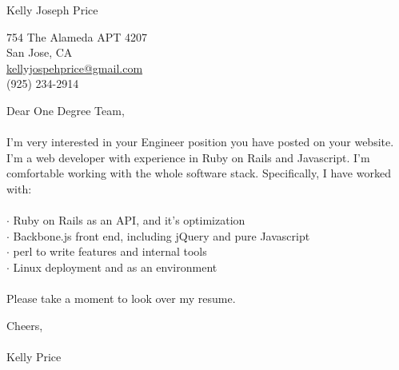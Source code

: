 \documentclass{article}
\begin{document}
\huge{Kelly Joseph Price}
\normalsize

\hspace{.5cm}

754 The Alameda APT 4207 \\
San Jose, CA \\
\href{mailto:kellyjosephprice@gmail.com}{kellyjospehprice@gmail.com} \\
(925) 234-2914 \\

\vspace{6cm}

Dear One Degree Team,
\\\\
I'm very interested in your Engineer position you have
posted on your website. I'm a web developer with experience in Ruby on
Rails and Javascript. I'm comfortable working with the whole software
stack. Specifically, I have worked with: \\
\\
$\cdot$ Ruby on Rails as an API, and it's optimization \\
$\cdot$ Backbone.js front end, including jQuery and pure Javascript \\
$\cdot$ perl to write features and internal tools \\
$\cdot$ Linux deployment and as an environment \\
\\
Please take a moment to look over my resume.

\vspace{1cm}

Cheers,
\\\\
Kelly Price
\end{document}
